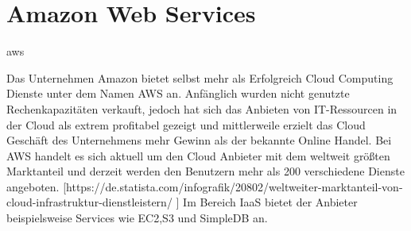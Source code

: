 \chapter{Amazon Web Services}\label{ch:4}
\acrfull{aws}

Das Unternehmen Amazon bietet selbst mehr als Erfolgreich Cloud Computing Dienste unter dem Namen AWS an. Anfänglich wurden nicht genutzte Rechenkapazitäten verkauft, jedoch hat sich das Anbieten von IT-Ressourcen in der Cloud als extrem profitabel gezeigt und mittlerweile erzielt das Cloud Geschäft des Unternehmens mehr Gewinn als der bekannte Online Handel. Bei AWS handelt es sich aktuell um den Cloud Anbieter mit dem weltweit größten Marktanteil und derzeit werden den Benutzern mehr als 200 verschiedene Dienste angeboten.  [https://de.statista.com/infografik/20802/weltweiter-marktanteil-von-cloud-infrastruktur-dienstleistern/
] 
Im Bereich IaaS bietet der Anbieter beispielsweise Services wie EC2,S3 und SimpleDB an. 